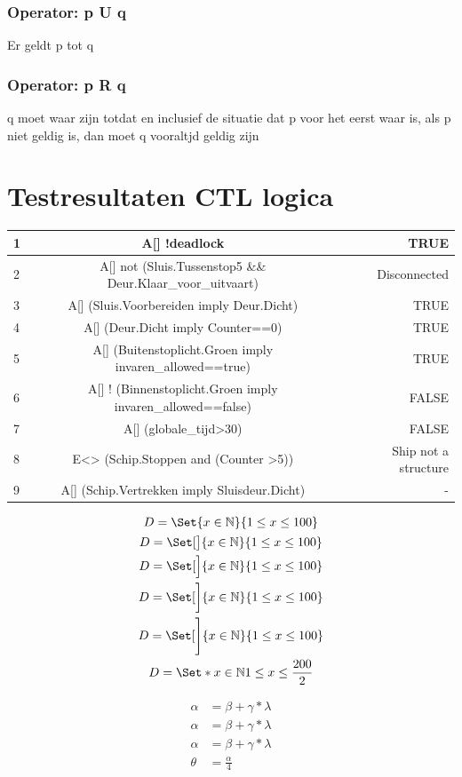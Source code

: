 \subsection{Operator: p U q}
Er geldt p tot q
~\cite{gnsguides}
\subsection{Operator: p R q}
q moet waar zijn totdat en inclusief de situatie dat p voor het eerst waar is, als p niet geldig is, dan moet q vooraltjd geldig zijn

\chapter{Testresultaten CTL logica}




\begin{center}
	\begin{tabular}{| l | c || r | }
		\hline
		1 &A[] !deadlock  &  TRUE \\ \hline
		2 & A[] not (Sluis.Tussenstop5 \&\& Deur.Klaar\_voor\_uitvaart)  &  Disconnected \\ \hline
		3 & A[]  (Sluis.Voorbereiden imply Deur.Dicht)   &  TRUE\\   \hline
		4 &A[]  (Deur.Dicht imply Counter==0)   & TRUE  \\   \hline
		5 & A[]  (Buitenstoplicht.Groen imply invaren\_allowed==true)  &  TRUE \\ \hline
		6 & A[] ! (Binnenstoplicht.Groen imply invaren\_allowed==false)  & FALSE \\ \hline
		7 & A[]  (globale\_tijd>30)   &  FALSE\\    \hline
		8 & E<>  (Schip.Stoppen and (Counter >5))   & Ship not a structure  \\   \hline
		9 & A[] (Schip.Vertrekken imply Sluisdeur.Dicht)  &  -  \\   \hline
		\hline
	\end{tabular}
\end{center}


\begin{center}
	\begin{gather*}
	D=\Set{x\in\nat}{1\le x\le 100}\\
	D=\Set[\big]{x\in\nat}{1\le x\le 100}\\
	D=\Set[\Big]{x\in\nat}{1\le x\le 100}\\
	D=\Set[\bigg]{x\in\nat}{1\le x\le 100}\\
	D=\Set[\Bigg]{x\in\nat}{1\le x\le 100}\\
	D=\Set*{x\in\nat}{1\le x\le \frac{200}{2}}
\end{gather*}

\begin{align}
	\alpha &= \beta + \gamma * \lambda \\
	\alpha &= \beta + \gamma * \lambda \\
	\alpha &= \beta + \gamma * \lambda \\
	\theta &= \frac{\alpha}{4}
\end{align} 
\end{center}

